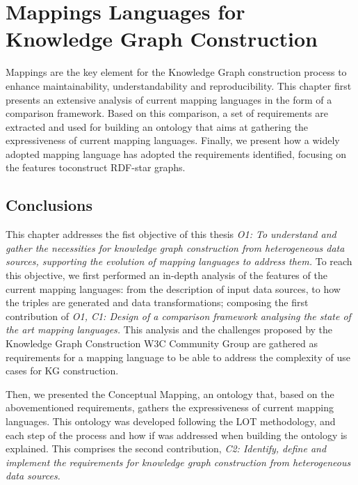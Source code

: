 
\chapter{Mappings Languages for Knowledge Graph Construction}
\label{chapter:mappings}

Mappings are the key element for the Knowledge Graph construction process to enhance maintainability, understandability and reproducibility. This chapter first presents an extensive analysis of current mapping languages in the form of a comparison framework. Based on this comparison, a set of requirements are extracted and used for building an ontology that aims at gathering the expressiveness of current mapping languages. Finally, we present how a widely adopted mapping language has adopted the requirements identified, focusing on the features toconstruct RDF-star graphs.








\section{Conclusions}

This chapter addresses the fist objective of this thesis \textit{O1: To understand and gather the necessities for knowledge graph construction from heterogeneous data sources, supporting the evolution of mapping languages to address them.} 
To reach this objective, we first performed an in-depth analysis of the features of the current mapping languages: from the description of input data sources, to how the triples are generated and data transformations; composing the first contribution of \textit{O1, C1: Design of a comparison framework analysing the state of the art mapping languages.}
This analysis and the challenges proposed by the Knowledge Graph Construction W3C Community Group are gathered as requirements for a mapping language to be able to address the complexity of use cases for KG construction. 

Then, we presented the Conceptual Mapping, an ontology that, based on the abovementioned requirements, gathers the expressiveness of current mapping languages. This ontology was developed following the LOT methodology, and each step of the process and how if was addressed when building the ontology is explained. 
This comprises the second contribution, \textit{C2: Identify, define and implement the requirements for knowledge graph construction from heterogeneous data sources.}

